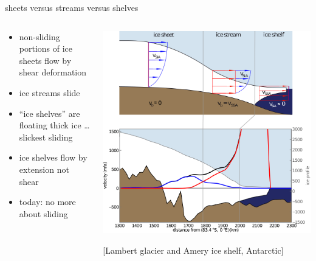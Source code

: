 \documentclass[hide notes,intlimits]{beamer}
\begin{document}
\begin{frame}{sheets versus streams versus shelves}

\begin{columns}
\begin{column}{0.35\textwidth}
\small
\begin{itemize}
\small
\item non-sliding portions of ice sheets flow by shear deformation
\item ice streams slide
\item ``ice shelves'' are floating thick ice \dots slickest sliding
\item ice shelves flow by extension not shear
\item today: \alert{no more about sliding}
\end{itemize}
\end{column}

\begin{column}{0.65\textwidth}
\includegraphics[width=\textwidth]{siassacartoon-lambert}

\begin{center}
\vspace{-0.18in}
\tiny [Lambert glacier and Amery ice shelf, Antarctic]
\end{center}
\end{column}
\end{columns}
\end{frame}
\end{document}
